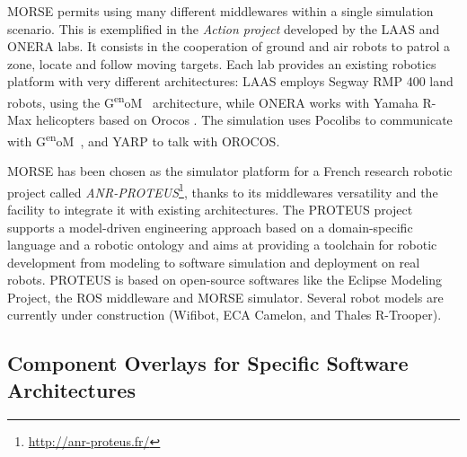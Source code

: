 \documentclass{llncs}
\def\genom{G\textsuperscript{en}oM~}
\newcommand{\serge}[1]{\nb{Serge}{blue}{#1}}
\begin{document}
MORSE permits using many different middlewares within a single simulation
scenario. This is exemplified in the \emph{Action project} \cite{6106782}
developed by the LAAS and ONERA labs.
It consists in the cooperation of ground and air robots to patrol a zone,
locate and follow moving targets.
Each lab provides an existing robotics platform with very different
architectures: LAAS employs Segway RMP 400 land robots, using the \genom
\cite{MALLET-2011-599677} architecture, while ONERA works with Yamaha R-Max
helicopters based on Orocos \cite{orocos2003}. The simulation uses Pocolibs to
communicate with \genom, and YARP to talk with OROCOS.

MORSE has been chosen as the simulator platform for a French research
robotic project called
\emph{ANR-PROTEUS}\footnote{\url{http://anr-proteus.fr/}}, thanks to
its middlewares versatility and the facility to integrate it with
existing architectures.
The PROTEUS project supports a model-driven engineering approach based on a
domain-specific language and a robotic ontology\cite{Dhouib:2011zr} and aims at
providing a toolchain for robotic development from modeling to software
simulation and deployment on real robots. PROTEUS is based on open-source
softwares like the Eclipse Modeling Project, the ROS middleware and MORSE
simulator. Several robot models are currently under construction (Wifibot,
ECA Camelon, and Thales R-Trooper).


\subsection{Component Overlays for Specific Software Architectures}
\label{section:overlays}

\end{document}
